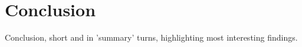 \section{Conclusion}
\label{sec:conclusion}
Conclusion, short and in 'summary' turns, highlighting most interesting findings.